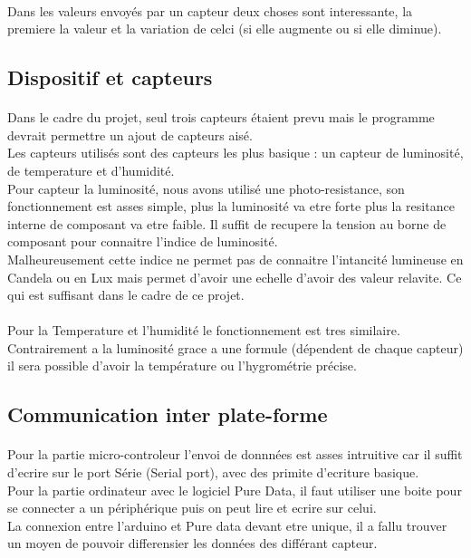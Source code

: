 \documentclass[a4paper, titlepage, oneside, 12pt]{article}%
\begin{document}
\paragraph{}
Dans les valeurs envoyés par un capteur deux choses sont interessante, la premiere la valeur et la variation de celci (si elle augmente ou si elle diminue).
\subsection{Dispositif et capteurs}
\paragraph{}
Dans le cadre du projet, seul trois capteurs étaient prevu mais le programme devrait permettre un ajout de capteurs  aisé.\\
Les capteurs utilisés sont des capteurs les plus basique : un capteur de luminosité, de temperature et d'humidité.\\
Pour capteur la luminosité, nous avons utilisé une photo-resistance, son fonctionnement est asses simple, plus la luminosité va etre forte plus la resitance interne de composant va etre faible. Il suffit de recupere la tension au borne de composant pour connaitre l'indice de luminosité.\\ 
Malheureusement cette indice ne permet pas de connaitre l'intancité lumineuse en Candela ou en Lux mais permet d'avoir une echelle d'avoir des valeur relavite. Ce qui est suffisant dans le cadre de ce projet.
\paragraph{}
Pour la Temperature et l'humidité le fonctionnement est tres similaire. Contrairement a la luminosité grace a une formule (dépendent de chaque capteur) il sera possible d'avoir la température ou l'hygrométrie précise. 

\subsection{Communication inter plate-forme}
\paragraph{}
Pour la partie micro-controleur l'envoi de donnnées est asses intruitive car il suffit d'ecrire sur le port Série (Serial port), avec des primite d'ecriture basique.\\
Pour la partie ordinateur avec le logiciel Pure Data, il faut utiliser une boite pour se connecter a un périphérique puis on peut lire et ecrire sur celui.\\
La connexion entre l'arduino et Pure data devant etre unique, il a fallu trouver un moyen de pouvoir differensier les données des différant capteur. 
\end{document}
